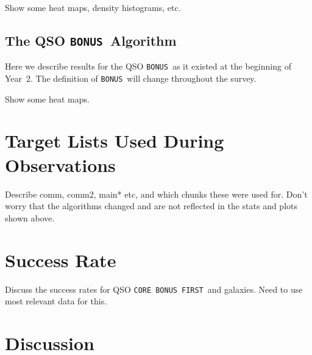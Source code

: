 \documentclass[12pt,preprint]{aastex}
\newcommand{\core}{\texttt{CORE}}
\newcommand{\bonus}{\texttt{BONUS}}
\newcommand{\first}{\texttt{FIRST}}
\begin{document}
Show some heat maps, density histograms, etc.

\subsection{The QSO \bonus\ Algorithm}

Here we describe results for the QSO \bonus\ as it existed at the beginning
of Year~2.  The definition of \bonus\ will change throughout the survey.

Show some heat maps.


\section{Target Lists Used During Observations}

Describe comm, comm2, main* etc, and which chunks these were used for.  Don't
worry that the algorithms changed and are not reflected in the stats and plots
shown above.

\section{Success Rate}

Discuss the success rates for QSO \core\, \bonus\, \first\ and galaxies.
Need to use most relevant data for this.

\section{Discussion}
\end{document}
